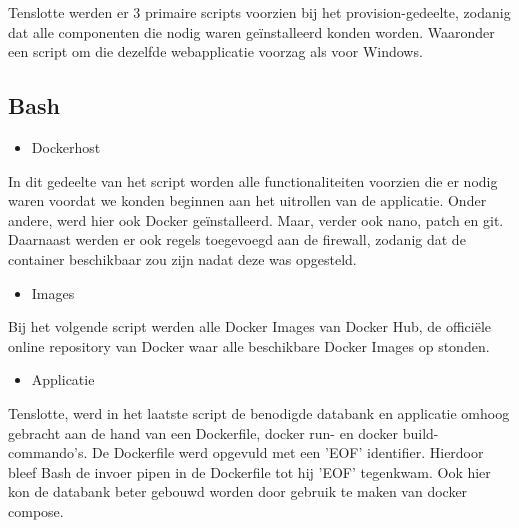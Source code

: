 
Tenslotte werden er 3 primaire scripts voorzien bij het provision-gedeelte, zodanig dat alle componenten die nodig waren geïnstalleerd konden worden. Waaronder een script om die dezelfde webapplicatie voorzag als voor Windows.

\subsection{Bash}

\begin{itemize}[noitemsep]
	\item Dockerhost
\end{itemize}

In dit gedeelte van het script worden alle functionaliteiten voorzien die er nodig waren voordat we konden beginnen aan het uitrollen van de applicatie. Onder andere, werd hier ook Docker geïnstalleerd. Maar, verder ook nano, patch en git.
Daarnaast werden er ook regels toegevoegd aan de firewall, zodanig dat de container beschikbaar zou zijn nadat deze was opgesteld.

\begin{itemize}[noitemsep]
	\item Images
\end{itemize}

Bij het volgende script werden alle Docker Images van Docker Hub, de officiële online repository van Docker waar alle beschikbare Docker Images op stonden.

\begin{itemize}[noitemsep]
	\item Applicatie
\end{itemize}

Tenslotte, werd in het laatste script de benodigde databank en applicatie omhoog gebracht aan de hand van een Dockerfile, docker run- en docker build-commando's.
De Dockerfile werd opgevuld met een 'EOF' identifier. Hierdoor bleef Bash de invoer pipen in de Dockerfile tot hij 'EOF' tegenkwam. Ook hier kon de databank beter gebouwd worden door gebruik te maken van docker compose.